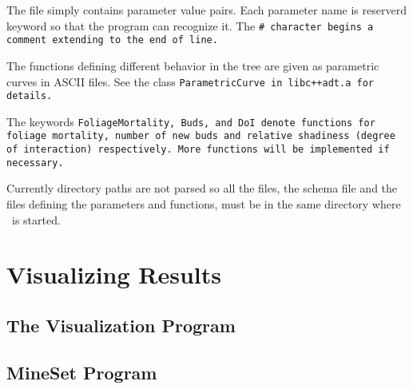 The file simply contains parameter value pairs. Each parameter
name is reserverd keyword so that the program can recognize it.
The \tt \# \rm character begins a comment extending to the end of line.

The functions defining different behavior in the tree are given
as parametric curves in ASCII files. See the class 
\tt ParametricCurve \rm in \tt libc++adt.a \rm for details.

The keywords \tt FoliageMortality\rm, \tt Buds\rm, and
\tt DoI \rm denote functions for foliage mortality, number of new buds 
and relative shadiness (degree of interaction) respectively. More functions
will be implemented if necessary.

Currently directory paths are not parsed so all the files,
the schema file and the files defining the parameters and functions,
must be in the same directory where \lignum\ is started.


\section{Visualizing Results}

\subsection{The Visualization Program}
\subsection{MineSet Program}








